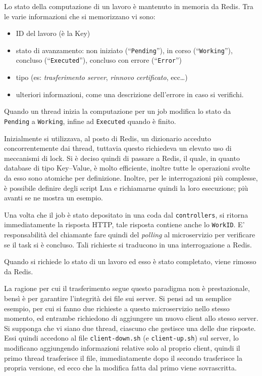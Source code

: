Lo stato della computazione di un lavoro è mantenuto in memoria da Redis. Tra le varie informazioni
che si memorizzano vi sono:
\begin{itemize}
	\item ID del lavoro (è la Key)
	\item stato di avanzamento: non iniziato (``\texttt{Pending}''), in corso (``\texttt{Working}''),
	      concluso (``\texttt{Executed}''), concluso con errore (``\texttt{Error}'')
	\item tipo (es: \textit{trasferimento server}, \textit{rinnovo certificato}, ecc\ldots)
	\item ulteriori informazioni, come una descrizione dell'errore in caso si verifichi.
\end{itemize}

Quando un thread inizia la computazione per un job modifica lo stato da \texttt{Pending}
a \texttt{Working}, infine ad \texttt{Executed} quando è finito.

Inizialmente si utilizzava, al posto di Redis, un dizionario acceduto concorrentemente dai thread,
tuttavia questo richiedeva un elevato uso di meccanismi di lock. Si è deciso quindi di
passare a Redis, il quale, in quanto database di tipo Key--Value, è molto efficiente,
inoltre tutte le operazioni svolte da esso sono atomiche per definizione.
Inoltre, per le interrogazioni più complesse, è possibile definire degli script Lua
e richiamarne quindi la loro esecuzione; più avanti se ne mostra un esempio.

Una volta che il job è stato depositato in una coda dal \texttt{controllers}, si ritorna immediatamente
la risposta HTTP, tale risposta contiene anche lo \texttt{WorkID}. E' responsabilità
del chiamante fare quindi del \textit{polling} al microservizio per verificare se il task
si è concluso. Tali richieste si traducono in una interrogazione a Redis.

Quando si richiede lo stato di un lavoro ed esso è stato completato, viene rimosso da Redis.

La ragione per cui il trasferimento segue questo paradigma non è prestazionale, bensì è per
garantire l'integrità dei file sui server.
Si pensi ad un semplice esempio, per cui si fanno due richieste a questo microservizio nello stesso
momento, ed entrambe richiedono di aggiungere un nuovo client allo stesso server.
Si supponga che vi siano due thread, ciascuno che gestisce una delle due risposte. Essi quindi
accedono al file \texttt{client-down.sh} (e \texttt{client-up.sh}) sul server, lo modificano
aggiungendo informazioni
relative solo al proprio client, quindi il primo thread trasferisce il file, immediatamente dopo
il secondo trasferisce la propria versione, ed ecco che la modifica fatta dal primo viene
sovrascritta.

